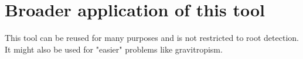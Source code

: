%
%
%
%
%
%
%

\section{Broader application of this tool}

This tool can be reused for many purposes and is not restricted to root detection.
It might also be used for "easier" problems like gravitropism.






